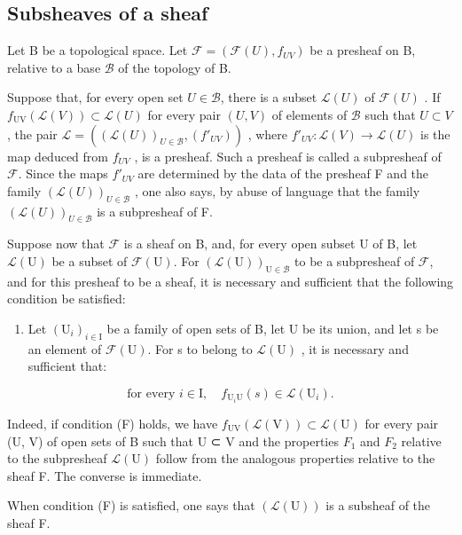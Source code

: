 \subsection{Subsheaves of a sheaf}

Let B be a topological space. Let \(\mathcal{F} = (\mathcal{F}(U), f_{UV})\) be a presheaf on B, relative to a base \(\mathcal{B}\) of the topology of B.

Suppose that, for every open set \(U \in \mathcal{B}\), there is a subset \(\mathcal{L}(U)\) of \(\mathcal{F}(U)\) . If \(f_{\mathrm{UV}}(\mathcal{L}(V)) \subset \mathcal{L}(U)\) for every pair \((U, V)\) of elements of \(\mathcal{B}\) such that \(U \subset V\), the pair \(\mathcal{L} = ((\mathcal{L}(U))_{U \in \mathcal{B}}, (f'_{UV}))\) , where \(f'_{UV} \colon \mathcal{L}(V) \to \mathcal{L}(U)\) is the map deduced from \(f_{UV}\) , is a presheaf. Such a presheaf is called a subpresheaf of \(\mathcal{F}\). Since the maps \(f'_{UV}\) are determined by the data of the presheaf F and the family \((\mathcal{L}(U))_{U \in \mathcal{B}}\) , one also says, by abuse of language that the family \((\mathcal{L}(U))_{U \in \mathcal{B}}\) is a subpresheaf of F.

Suppose now that \(\mathcal{F}\) is a sheaf on B, and, for every open subset U of B, let \(\mathcal{L}(\mathrm{U})\) be a subset of \(\mathcal{F}(\mathrm{U})\). For \((\mathcal{L}(\mathrm{U}))_{\mathrm{U}\in \mathcal{B}}\) to be a subpresheaf of \(\mathcal{F}\), and for this presheaf to be a sheaf, it is necessary and sufficient that the following condition be satisfied:

\begin{enumerate}
\def\labelenumi{(\Alph{enumi})}
\setcounter{enumi}{5}
\tightlist
\item
  Let \((\mathrm{U}_{i})_{i\in\mathrm{I}}\) be a family of open sets of B, let U be its union, and let s be an element of \(\mathcal{F}(\mathrm{U})\). For s to belong to \(\mathcal{L}(\mathrm{U})\) , it is necessary and sufficient that:
\end{enumerate}

\[
\text{for every } i \in \mathrm{I},\quad f_{\mathrm{U}_{i}\mathrm{U}}(s)\in\mathcal{L}(\mathrm{U}_{i}).
\]

Indeed, if condition (F) holds, we have \(f_{\mathrm{UV}}(\mathcal{L}(\mathrm{V})) \subset \mathcal{L}(\mathrm{U})\) for every pair (U, V) of open sets of B such that U ⊂ V and the properties \(F_{1}\) and \(F_{2}\) relative to the subpresheaf \(\mathcal{L}(\mathrm{U})\) follow from the analogous properties relative to the sheaf F. The converse is immediate.

When condition (F) is satisfied, one says that \((\mathcal{L}(\mathrm{U}))\) is a subsheaf of the sheaf F.

